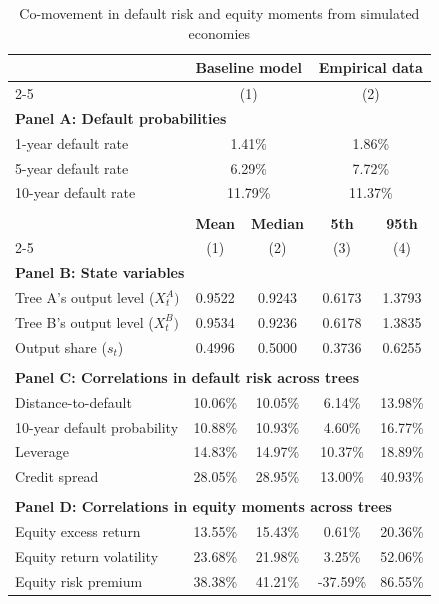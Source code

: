 \begin{table}[h]
\small
\centering
\caption{Co-movement in default risk and equity moments from simulated economies}
\label{tab:table_simulation}
\begin{tabular*}{\textwidth}{@{\extracolsep{\fill}}lcccc}
\toprule
& \multicolumn{2}{c}{\textbf{Baseline model}} & \multicolumn{2}{c}{\textbf{Empirical data}} \\
\cmidrule{2-5}
& \multicolumn{2}{c}{(1)} & \multicolumn{2}{c}{(2)} \\
\multicolumn{5}{l}{\textbf{Panel A: Default probabilities}} \\
\midrule
\multicolumn{1}{l}{1-year default rate} & \multicolumn{2}{c}{1.41\%} & \multicolumn{2}{c}{1.86\%} \\
\multicolumn{1}{l}{5-year default rate} & \multicolumn{2}{c}{6.29\%} & \multicolumn{2}{c}{7.72\%} \\
\multicolumn{1}{l}{10-year default rate} & \multicolumn{2}{c}{11.79\%} & \multicolumn{2}{c}{11.37\%} \\
\\
\midrule
& \textbf{Mean} & \textbf{Median} & \textbf{5th} & \textbf{95th} \\
\cmidrule{2-5}
& (1) & (2) & (3) & (4) \\
\multicolumn{5}{l}{\textbf{Panel B: State variables }} \\
\midrule
\multicolumn{1}{l}{Tree A's output level ($X^A_t)$} & 0.9522 & 0.9243 & 0.6173 & 1.3793 \\
\multicolumn{1}{l}{Tree B's output level ($X^B_t)$} & 0.9534 & 0.9236 & 0.6178 & 1.3835 \\
\multicolumn{1}{l}{Output share ($s_t$)} & 0.4996 & 0.5000 & 0.3736 & 0.6255 \\
\\
\multicolumn{5}{l}{\textbf{Panel C: Correlations in default risk across trees }} \\
\midrule
\multicolumn{1}{l}{Distance-to-default} & 10.06\% & 10.05\% & 6.14\% & 13.98\% \\
\multicolumn{1}{l}{10-year default probability} & 10.88\% & 10.93\% & 4.60\% & 16.77\% \\
\multicolumn{1}{l}{Leverage} & 14.83\% & 14.97\% & 10.37\% & 18.89\% \\
\multicolumn{1}{l}{Credit spread} & 28.05\% & 28.95\% & 13.00\% & 40.93\% \\
\\
\multicolumn{5}{l}{\textbf{Panel D: Correlations in equity moments across trees  }} \\
\midrule
\multicolumn{1}{l}{Equity excess return} & 13.55\% & 15.43\% & 0.61\% & 20.36\% \\
\multicolumn{1}{l}{Equity return volatility} & 23.68\% & 21.98\% & 3.25\% & 52.06\% \\
\multicolumn{1}{l}{Equity risk premium} & 38.38\% & 41.21\% & -37.59\% & 86.55\% \\
\bottomrule
\end{tabular*}
\end{table}
